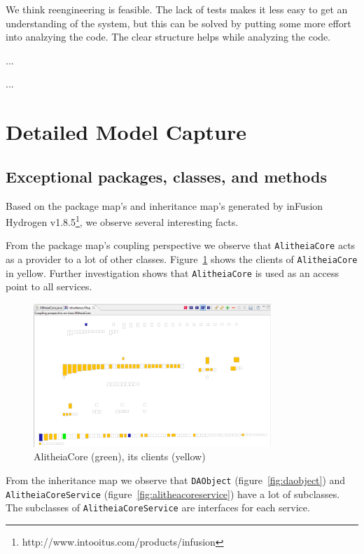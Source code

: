 \documentclass{article}
\begin{document}
We think reengineering is feasible. The lack of tests makes it less easy to get an understanding of the system, but this can be solved by putting some more effort into analzying the code. The clear structure helps while analyzing the code.

...

...

\section{Detailed Model Capture}

\subsection{Exceptional packages, classes, and methods}
Based on the package map's and inheritance map's generated by inFusion Hydrogen v1.8.5\footnote{http://www.intooitus.com/products/infusion}, we observe several interesting facts.

From the package map's coupling perspective we observe that \verb|AlitheiaCore| acts as a provider to a lot of other classes. Figure~\ref{fig:alitheiacore} shows the clients of \verb|AlitheiaCore| in yellow. Further investigation shows that \verb|AlitheiaCore| is used as an access point to all services.

\begin{figure}[h]
    \centering
    \includegraphics[width=0.8\textwidth]{alitheiacore-coupling}
    \caption{AlitheiaCore (green), its clients (yellow)}
    \label{fig:alitheiacore}
\end{figure}

From the inheritance map we observe that \verb|DAObject| (figure~\ref{fig:daobject}) and \verb|AlitheiaCoreService| (figure~\ref{fig:alitheacoreservice}) have a lot of subclasses.	The subclasses of \verb|AlitheiaCoreService| are interfaces for each service.
\end{document}
